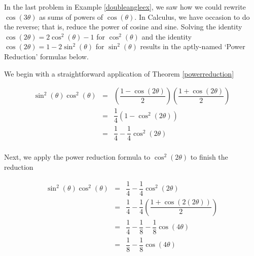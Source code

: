 \medskip

In the last problem in Example \ref{doubleangleex}, we saw how we could rewrite $\cos(3\theta)$ as sums of powers of  $\cos(\theta)$.  In Calculus, we have occasion to do the reverse;  that is, reduce the power of cosine and sine. Solving the identity $\cos(2\theta) = 2\cos^{2}(\theta) -1$ for $\cos^{2}(\theta)$  and the identity $\cos(2\theta) = 1 - 2\sin^{2}(\theta)$ for $\sin^{2}(\theta)$ results in the aptly-named `Power Reduction' formulas below.  

\smallskip


\medskip

{We begin with a straightforward application of Theorem \ref{powerreduction}

\[ \begin{array}{rcl}

\sin^{2}(\theta) \cos^{2}(\theta) & = & \left( \dfrac{1 - \cos(2\theta)}{2} \right) \left( \dfrac{1 + \cos(2\theta)}{2} \right) \\ [10pt]
																  & = & \dfrac{1}{4}\left(1 - \cos^{2}(2\theta)\right) \\ [10pt] 
																  & = & \dfrac{1}{4} - \dfrac{1}{4}\cos^{2}(2\theta) \\ 
\end{array} \]

Next, we apply the power reduction formula to $\cos^{2}(2\theta)$ to finish the reduction

\[ \begin{array}{rcl}

\sin^{2}(\theta) \cos^{2}(\theta)  & = & \dfrac{1}{4} - \dfrac{1}{4}\cos^{2}(2\theta) \\ [10pt]
																	 & = & \dfrac{1}{4} - \dfrac{1}{4} \left(\dfrac{1 + \cos(2(2\theta))}{2}\right) \\ [10pt]
																	 & = & \dfrac{1}{4} - \dfrac{1}{8}  - \dfrac{1}{8}\cos(4\theta) \\ [10pt]
																	 & = & \dfrac{1}{8} - \dfrac{1}{8}\cos(4\theta) \\ 
\end{array} \]
}

